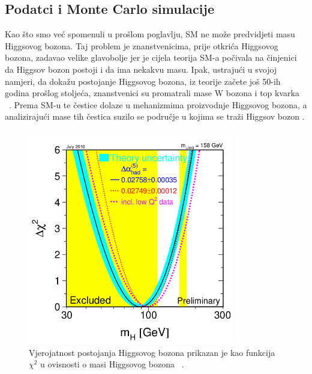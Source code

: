 \documentclass[12pt,a4paper,oneside]{article}
\begin{document}
\begin{linenumbers}
	
	
	
		\subsection{Podatci i Monte Carlo simulacije}
		Kao što smo već spomenuli u prošlom poglavlju, SM ne može predvidjeti masu Higgsovog bozona. Taj problem je znanstvenicima, prije otkrića Higgsovog bozona, zadavao velike glavobolje jer je cijela teorija SM-a počivala na činjenici da Higgsov bozon postoji i da ima nekakvu masu. Ipak, ustrajući u svojoj namjeri, da dokažu postojanje Higgsovog bozona, iz teorije začete još 50-ih godina prošlog stoljeća, znanstvenici su promatrali mase W bozona i top kvarka ~\cite{royal-sm}. Prema SM-u te čestice dolaze u mehanizmima proizvodnje Higgsovog bozona, a analizirajući mase tih  čestica suzilo se područje u kojima se traži Higgsov bozon .
		\begin{figure}[H]
			\centering
			\includegraphics[width=0.8\textwidth]{sl2.png}
			\caption[Saturn viđen u ultraljubičastom svjetlu.]{\label{sl:sl2}Vjerojatnost postojanja Higgsovog bozona prikazan je kao funkcija \begin{math}
				\chi^2
				\end{math} u ovisnosti o masi Higgsovog bozona ~\cite{royal-sm}. }
		\end{figure}
		

\end{linenumbers}
\end{document}
